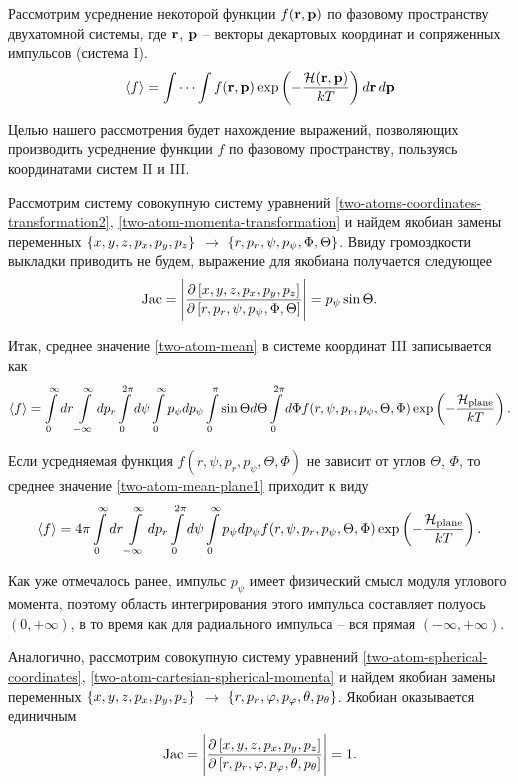 Рассмотрим усреднение некоторой функции $f(\mathbf{r}, \mathbf{p})$ по фазовому пространству двухатомной системы, где $\mathbf{r}$, $\mathbf{p}$ -- векторы декартовых координат и сопряженных импульсов (система I). 
\begin{gather}
    \langle f \rangle = \idotsint f(\mathbf{r}, \mathbf{p}) \exp \left( -\frac{\mathcal{H}(\mathbf{r},\mathbf{p})}{kT} \right) d \mathbf{r} \, d\mathbf{p} \label{two-atom-mean}
\end{gather}

Целью нашего рассмотрения будет нахождение выражений, позволяющих производить усреднение функции $f$ по фазовому пространству, пользуясь координатами систем II и III. \par
Рассмотрим систему совокупную систему уравнений \eqref{two-atoms-coordinates-transformation2}, \eqref{two-atom-momenta-transformation} и найдем якобиан замены переменных $\left\{ x, y, z, p_x, p_y, p_z \right\}$ $\rightarrow$ $\left\{ r, p_r, \psi, p_\psi, \Phi, \Theta \right\}$. Ввиду громоздкости выкладки приводить не будем, выражение для якобиана получается следующее
\begin{gather}
    \text{Jac} = \Bigg\vert \frac{\partial \left[ x, y, z, p_x, p_y, p_z \right]}{\partial \left[ r, p_r, \psi, p_\psi, \Phi, \Theta \right]} \Bigg\vert = p_\psi \sin \Theta. \label{two-atom-planar-jacobian}
\end{gather}

Итак, среднее значение \eqref{two-atom-mean} в системе координат III записывается как
\begin{gather}
    \langle  f  \rangle = \int\limits_{0}^{\infty} dr \int\limits_{-\infty}^\infty dp_r \int\limits_0^{2\pi} d\psi \int\limits_0^\infty p_\psi dp_\psi \int\limits_0^\pi \sin \Theta d\Theta \int\limits_0^{2\pi} d\Phi f(r, \psi, p_r, p_\psi, \Theta, \Phi) \exp \left( -\frac{\mathcal{H}_\text{plane}}{k T} \right). \label{two-atom-mean-plane1} 
\end{gather}

Если усредняемая функция $f(r, \psi, p_r, p_\psi, \Theta, \Phi)$ не зависит от углов $\Theta$, $\Phi$, то среднее значение  \eqref{two-atom-mean-plane1} приходит к виду
\begin{gather}
    \langle  f  \rangle = 4 \pi \int\limits_{0}^{\infty} dr \int\limits_{-\infty}^\infty dp_r \int\limits_0^{2\pi} d\psi \int\limits_0^\infty p_\psi dp_\psi f(r, \psi, p_r, p_\psi, \Theta, \Phi) \exp \left( -\frac{\mathcal{H}_\text{plane}}{k T} \right). \label{two-atom-mean-plane2} 
\end{gather}

Как уже отмечалось ранее, импульс $p_\psi$ имеет физический смысл модуля углового момента, поэтому область интегрирования этого импульса составляет полуось $(0, +\infty)$, в то время как для радиального импульса -- вся прямая $(-\infty, +\infty)$. \par
Аналогично, рассмотрим совокупную систему уравнений \eqref{two-atom-spherical-coordinates}, \eqref{two-atom-cartesian-spherical-momenta} и найдем якобиан замены переменных $\left\{ x, y, z, p_x, p_y, p_z \right\}$ $\rightarrow$ $\left\{ r, p_r, \varphi, p_\varphi, \theta, p_\theta \right\}$. Якобиан оказывается единичным 
\begin{gather}
    \text{Jac} = \Bigg\vert \frac{\partial \left[ x, y, z, p_x, p_y, p_z \right]}{\partial \left[ r, p_r, \varphi, p_\varphi, \theta, p_\theta \right]} \Bigg\vert = 1. 
\end{gather}

